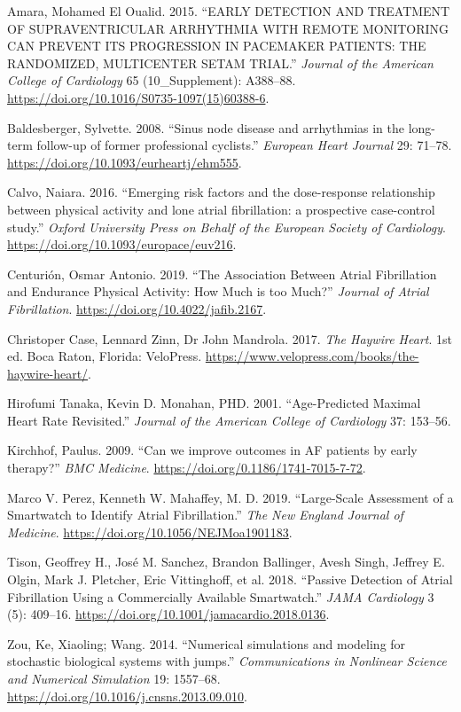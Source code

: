 \documentclass[
  letterpaper,
  DIV=11,
  numbers=noendperiod]{scrartcl}
\newlength{\cslhangindent}
\newenvironment{CSLReferences}[2] %
 {\begin{list}{}{%
  \setlength{\itemindent}{0pt}
  \setlength{\leftmargin}{0pt}
  \setlength{\parsep}{0pt}
  \ifodd #1
   \setlength{\leftmargin}{\cslhangindent}
   \setlength{\itemindent}{-1\cslhangindent}
  \fi
  \setlength{\itemsep}{#2\baselineskip}}}
 {\end{list}}
\begin{document}
\label{refs}
\begin{CSLReferences}{1}{0}
Amara, Mohamed El Oualid. 2015. {``{EARLY DETECTION AND TREATMENT OF
SUPRAVENTRICULAR ARRHYTHMIA WITH REMOTE MONITORING CAN PREVENT ITS
PROGRESSION IN PACEMAKER PATIENTS: THE RANDOMIZED, MULTICENTER SETAM
TRIAL}.''} \emph{Journal of the American College of Cardiology} 65
(10\_Supplement): A388--88.
\url{https://doi.org/10.1016/S0735-1097(15)60388-6}.

Baldesberger, Sylvette. 2008. {``{Sinus node disease and arrhythmias in
the long-term follow-up of former professional cyclists}.''}
\emph{European Heart Journal} 29: 71--78.
\url{https://doi.org/10.1093/eurheartj/ehm555}.

Calvo, Naiara. 2016. {``{Emerging risk factors and the dose-response
relationship between physical activity and lone atrial fibrillation: a
prospective case-control study}.''} \emph{Oxford University Press on
Behalf of the European Society of Cardiology}.
\url{https://doi.org/10.1093/europace/euv216}.

Centurión, Osmar Antonio. 2019. {``{The Association Between Atrial
Fibrillation and Endurance Physical Activity: How Much is too Much?}''}
\emph{Journal of Atrial Fibrillation}.
\url{https://doi.org/10.4022/jafib.2167}.

Christoper Case, Lennard Zinn, Dr John Mandrola. 2017. \emph{The Haywire
Heart}. 1st ed. Boca Raton, Florida: VeloPress.
\url{https://www.velopress.com/books/the-haywire-heart/}.

Hirofumi Tanaka, Kevin D. Monahan, PHD. 2001. {``{Age-Predicted Maximal
Heart Rate Revisited}.''} \emph{Journal of the American College of
Cardiology} 37: 153--56.

Kirchhof, Paulus. 2009. {``{Can we improve outcomes in AF patients by
early therapy?}''} \emph{BMC Medicine}.
\url{https://doi.org/0.1186/1741-7015-7-72}.

Marco V. Perez, Kenneth W. Mahaffey, M. D. 2019. {``{Large-Scale
Assessment of a Smartwatch to Identify Atrial Fibrillation}.''}
\emph{The New England Journal of Medicine}.
\url{https://doi.org/10.1056/NEJMoa1901183}.

Tison, Geoffrey H., José M. Sanchez, Brandon Ballinger, Avesh Singh,
Jeffrey E. Olgin, Mark J. Pletcher, Eric Vittinghoff, et al. 2018.
{``{Passive Detection of Atrial Fibrillation Using a Commercially
Available Smartwatch}.''} \emph{JAMA Cardiology} 3 (5): 409--16.
\url{https://doi.org/10.1001/jamacardio.2018.0136}.

Zou, Ke, Xiaoling; Wang. 2014. {``{Numerical simulations and modeling
for stochastic biological systems with jumps}.''} \emph{Communications
in Nonlinear Science and Numerical Simulation} 19: 1557--68.
\url{https://doi.org/10.1016/j.cnsns.2013.09.010}.

\end{CSLReferences}
\end{document}
